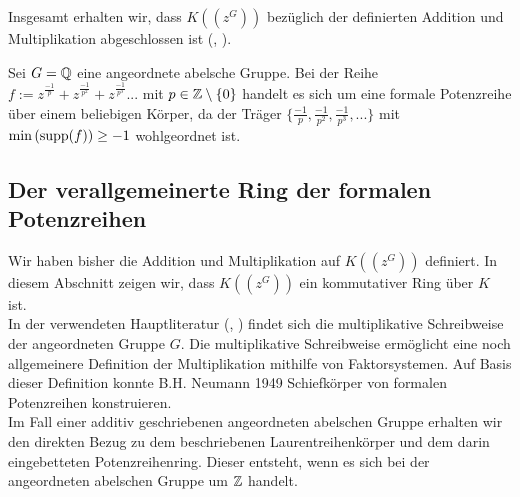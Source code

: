 {%
%
%
%
%
%
}

Insgesamt erhalten wir, dass $K\left(\left(z^{G}\right)\right)$ bezüglich der definierten Addition und Multiplikation abgeschlossen ist (\cite[Seite 601ff]{hahn07}, \cite[S. 210- 213]{neumann49}).
%
% 
%
\begin{bsp}
Sei $G = \mathbb{Q}$ eine angeordnete abelsche Gruppe. Bei der Reihe $f := z^{\frac{-1}{p}}+  z^{\frac{-1}{p^2}} + z^{\frac{-1}{p^3}} ...$ mit $p\in \mathbb{Z}\setminus\lbrace0\rbrace$ handelt es sich um eine formale Potenzreihe über einem beliebigen Körper, da der Träger $\lbrace \frac{-1}{p}, \frac{-1}{p^2}, \frac{-1}{p^3}, ... \rbrace$ mit $\min\left(\textup{supp}(f)\right) \geq -1$ wohlgeordnet ist.
\end{bsp}
%
%
%
%
%
%
%
%
\subsection{Der verallgemeinerte Ring der formalen Potenzreihen} 
Wir haben bisher die Addition und Multiplikation auf $K\left(\left(z^{G}\right)\right)$ definiert. In diesem Abschnitt zeigen wir, dass $K\left(\left(z^{G}\right)\right)$ ein kommutativer Ring über $K$ ist.\\
In der verwendeten Hauptliteratur (\cite{priesscrampe83}, \cite{fuchs66}) findet sich die multiplikative Schreibweise der angeordneten Gruppe $G$. Die multiplikative Schreibweise ermöglicht eine noch allgemeinere Definition der Multiplikation mithilfe von Faktorsystemen. Auf Basis dieser Definition konnte B.H. Neumann 1949 Schiefkörper von formalen Potenzreihen konstruieren.  \\
Im Fall einer additiv geschriebenen angeordneten abelschen Gruppe erhalten wir den direkten Bezug zu dem beschriebenen Laurentreihenkörper und dem darin eingebetteten Potenzreihenring. Dieser entsteht, wenn es sich bei der angeordneten abelschen Gruppe um $\mathbb{Z}$ handelt. 

